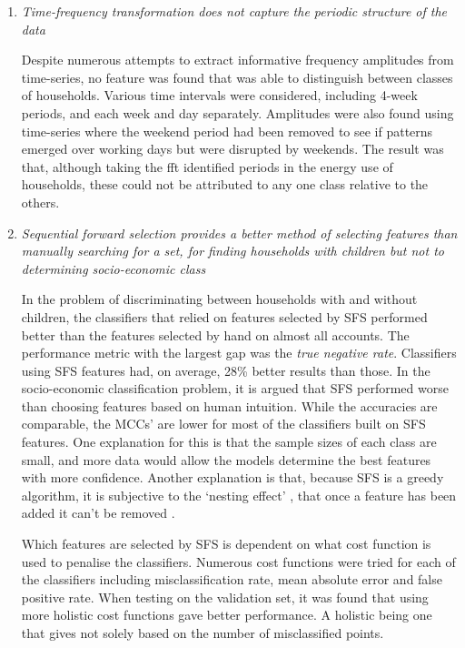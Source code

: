 \begin{enumerate}
\item \textit{Time-frequency transformation does not capture the periodic structure of the data}

Despite numerous attempts to extract informative frequency amplitudes from time-series, no feature was found that was able to distinguish between classes of households. Various time intervals were considered, including 4-week periods, and each week and day separately. Amplitudes were also found using time-series where the weekend period had been removed to see if patterns emerged over working days but were disrupted by weekends. The result was that, although taking the fft identified periods in the energy use of households, these could not be attributed to any one class relative to the others. 

\item \textit{Sequential forward selection provides a better method of selecting features than manually searching for a set, for finding households with children but not to determining socio-economic class }

In the problem of discriminating between households with and without children, the classifiers that relied on features selected by SFS performed better than the features selected by hand on almost all accounts. The performance metric with the largest gap was the \textit{true negative rate}. Classifiers using SFS features had, on average, 28\% better results than those. In the socio-economic classification problem, it is argued that SFS performed worse than choosing features based on human intuition. While the accuracies are comparable, the MCCs' are lower for most of the classifiers built on SFS features. One explanation for this is that the sample sizes of each class are small, and more data would allow the models determine the best features with more confidence. Another explanation is that, because SFS is a greedy algorithm, it is subjective to the `nesting effect' , that once a feature has been added it can't be removed \cite{Guyon}.   	

Which features are selected by SFS is dependent on what cost function is used to penalise the classifiers. Numerous cost functions were tried for each of the classifiers including misclassification rate, mean absolute error and false positive rate. When testing on the validation set, it was found that using more holistic cost functions gave better performance. A holistic being one that gives not solely based on the number of misclassified points.



\end{enumerate}
